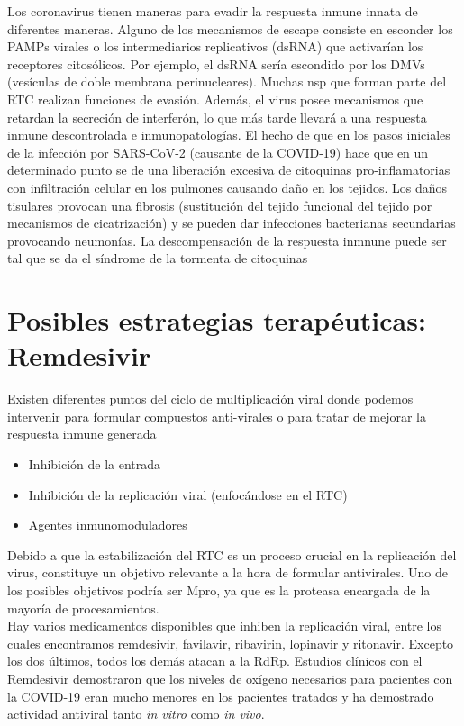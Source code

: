 \documentclass[a4paper,11pt]{report}
\begin{document}
 Los coronavirus tienen maneras para evadir la respuesta inmune innata de diferentes maneras. Alguno de los mecanismos de escape consiste en esconder los PAMPs virales o los intermediarios replicativos (dsRNA) que activarían los receptores citosólicos. Por ejemplo, el dsRNA sería escondido por los DMVs (vesículas de doble membrana perinucleares). Muchas nsp que forman parte del RTC realizan funciones de evasión.
 Además, el virus posee mecanismos que retardan la secreción de interferón, lo que más tarde llevará a una respuesta inmune descontrolada e inmunopatologías. El hecho de que en los pasos iniciales de la infección por SARS-CoV-2 (causante de la COVID-19) hace que en un determinado punto se de una liberación excesiva de citoquinas pro-inflamatorias con infiltración celular en los pulmones causando daño en los tejidos. Los daños tisulares provocan una fibrosis (sustitución del tejido funcional del tejido por mecanismos de cicatrización) y se pueden dar infecciones bacterianas secundarias provocando neumonías. La descompensación de la respuesta inmnune puede ser tal que se da el síndrome de la tormenta de citoquinas

 
 \section{Posibles estrategias terapéuticas: Remdesivir}
 Existen diferentes puntos del ciclo de multiplicación viral donde podemos intervenir para formular compuestos anti-virales o para tratar de mejorar la respuesta inmune generada 
 
 \begin{itemize}
 	\item Inhibición de la entrada
 	\item Inhibición de la replicación viral (enfocándose en el RTC)
 	\item Agentes inmunomoduladores
 \end{itemize}

 Debido a que la estabilización del RTC es un proceso crucial en la replicación del virus, constituye un objetivo relevante a la hora de formular antivirales. Uno de los posibles objetivos podría ser Mpro, ya que es la proteasa encargada de la mayoría de procesamientos.\\ 
 Hay varios medicamentos disponibles que inhiben la replicación viral, entre los cuales encontramos remdesivir, favilavir, ribavirin, lopinavir y ritonavir. Excepto los dos últimos, todos los demás atacan a la RdRp. Estudios clínicos con el Remdesivir demostraron que los niveles de oxígeno necesarios para pacientes con la COVID-19 eran mucho menores en los pacientes tratados y ha demostrado actividad antiviral tanto \textit{in vitro} como \textit{in vivo}.
  
\end{document}

